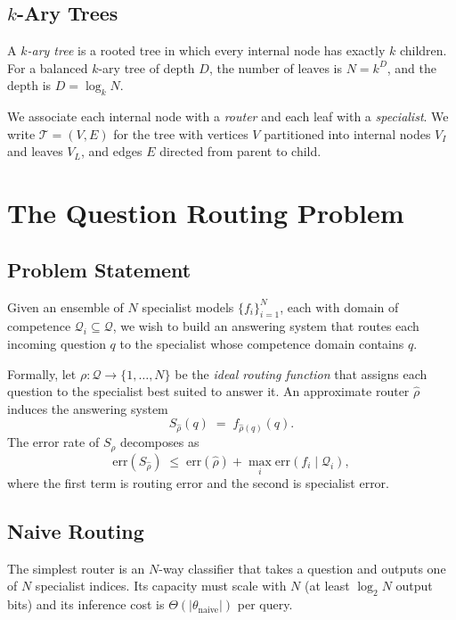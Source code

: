 \documentclass[11pt,a4paper]{article}
\theoremstyle{definition}
\theoremstyle{remark}
\newcommand{\Qc}{\mathcal{Q}}
\begin{document}
\subsection{$k$-Ary Trees}

A \emph{$k$-ary tree} is a rooted tree in which every internal node has exactly $k$ children. For a balanced $k$-ary tree of depth $D$, the number of leaves is $N = k^D$, and the depth is $D = \log_k N$.

We associate each internal node with a \emph{router} and each leaf with a \emph{specialist}. We write $\mathcal{T} = (V, E)$ for the tree with vertices $V$ partitioned into internal nodes $V_I$ and leaves $V_L$, and edges $E$ directed from parent to child.

\section{The Question Routing Problem}
\label{sec:problem}

\subsection{Problem Statement}

Given an ensemble of $N$ specialist models $\{f_i\}_{i=1}^N$, each with domain of competence $\mathcal{Q}_i \subseteq \Qc$, we wish to build an answering system that routes each incoming question $q$ to the specialist whose competence domain contains $q$.

Formally, let $\rho: \Qc \to \{1, \ldots, N\}$ be the \emph{ideal routing function} that assigns each question to the specialist best suited to answer it. An approximate router $\hat\rho$ induces the answering system
\[
S_{\hat\rho}(q) \;=\; f_{\hat\rho(q)}(q).
\]
The error rate of $S_{\hat\rho}$ decomposes as
\[
\mathrm{err}(S_{\hat\rho}) \;\leq\; \mathrm{err}(\hat\rho) + \max_i \mathrm{err}(f_i \mid \mathcal{Q}_i),
\]
where the first term is routing error and the second is specialist error.

\subsection{Naive Routing}

The simplest router is an $N$-way classifier that takes a question and outputs one of $N$ specialist indices. Its capacity must scale with $N$ (at least $\log_2 N$ output bits) and its inference cost is $\Theta(|\theta_{\mathrm{naive}}|)$ per query.
\end{document}
